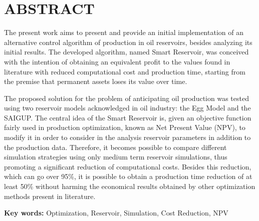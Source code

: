 \chapter[ABSTRACT]{ABSTRACT}
{
The present work aims to present and provide an initial implementation of an alternative control algorithm of production in oil reservoirs, besides analyzing its initial results. The developed algorithm, named Smart Reservoir, was conceived with the intention of obtaining an equivalent profit to the values found in literature with reduced computational cost and production time, starting from the premise that permanent assets loses its value over time.

The proposed solution for the problem of anticipating oil production was tested using two reservoir models acknowledged in oil industry: the Egg Model and the SAIGUP. The central idea of the Smart Reservoir is, given an objective function fairly used in production optimization, known as Net Present Value (NPV), to modify it in order to consider in the analysis reservoir parameters in addition to the production data. Therefore, it becomes possible to compare different simulation strategies using only medium term reservoir simulations, thus promoting a significant reduction of computational costs. Besides this reduction, which can go over 95\%, it is possible to obtain a production time reduction of at least 50\% without harming the economical results obtained by other optimization methods present in literature.
 
\textbf{Key words:} Optimization, Reservoir, Simulation, Cost Reduction, NPV
}